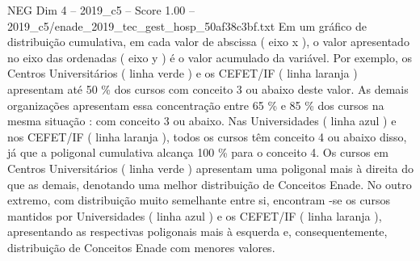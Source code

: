 \begin{textsample}{NEG Dim 4 – 2019\_c5 – Score 1.00 – 2019\_c5/enade\_2019\_tec\_gest\_hosp\_50af38c3bf.txt}
Em um gráfico de distribuição cumulativa, em cada valor de abscissa ( eixo x ), o valor apresentado no eixo das ordenadas ( eixo y ) é o valor acumulado da variável.
Por exemplo, os Centros Universitários ( linha verde ) e os CEFET/IF ( linha laranja ) apresentam até 50 \% dos cursos com conceito 3 ou abaixo deste valor.
As demais organizações apresentam essa concentração entre 65 \% e 85 \% dos cursos na mesma situação : com conceito 3 ou abaixo.
Nas Universidades ( linha azul ) e nos CEFET/IF ( linha laranja ), todos os cursos têm conceito 4 ou abaixo disso, já que a poligonal cumulativa alcança 100 \% para o conceito 4.
Os cursos em Centros Universitários ( linha verde ) apresentam uma poligonal mais à direita do que as demais, denotando uma melhor distribuição de Conceitos Enade.
No outro extremo, com distribuição muito semelhante entre si, encontram -se os cursos mantidos por Universidades ( linha azul ) e os CEFET/IF ( linha laranja ), apresentando as respectivas poligonais mais à esquerda e, consequentemente, distribuição de Conceitos Enade com menores valores.

\end{textsample}
